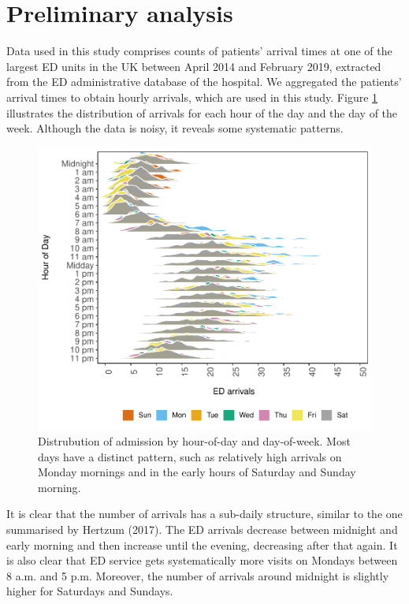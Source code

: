 \documentclass[]{elsarticle} %
\begin{document}
\hypertarget{data}{%
\section{Preliminary analysis}\label{data}}

Data used in this study comprises counts of patients' arrival times at
one of the largest ED units in the UK between April 2014 and February
2019, extracted from the ED administrative database of the hospital. We
aggregated the patients' arrival times to obtain hourly arrivals, which
are used in this study. Figure \ref{fig:hourly-plot-ridge} illustrates
the distribution of arrivals for each hour of the day and the day of the
week. Although the data is noisy, it reveals some systematic patterns.

\begin{figure}[H]

{\centering \includegraphics{paper_files/figure-latex/hourly-plot-ridge-1} 

}

\caption{Distrubution of admission by hour-of-day and day-of-week. Most days have a distinct pattern, such as relatively high arrivals on Monday mornings and in the early hours of Saturday and Sunday morning.}\label{fig:hourly-plot-ridge}
\end{figure}

It is clear that the number of arrivals has a sub-daily structure,
similar to the one summarised by Hertzum (2017). The ED
arrivals decrease between midnight and early morning and then increase
until the evening, decreasing after that again. It is also clear that ED
service gets systematically more visits on Mondays between 8 a.m. and 5
p.m. Moreover, the number of arrivals around midnight is slightly higher
for Saturdays and Sundays.
\end{document}
